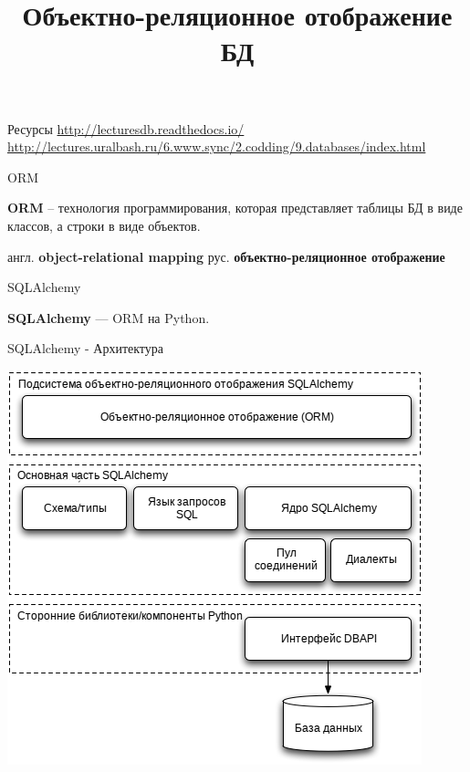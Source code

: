 

\title{Объектно-реляционное отображение БД}



\frame{\titlepage}

\begin{frame}{Ресурсы}
  \url{http://lecturesdb.readthedocs.io/}\newline
  \url{http://lectures.uralbash.ru/6.www.sync/2.codding/9.databases/index.html}
\end{frame}

\begin{frame}{ORM}

  \textbf{ORM} -- технология программирования, которая представляет таблицы БД
  в виде классов, а строки в виде объектов.

  англ. \textbf{object-relational mapping} \newline
  рус. \textbf{объектно-реляционное отображение}

\end{frame}

\begin{frame}{SQLAlchemy}

  \textbf{SQLAlchemy} — ORM на Python.

\end{frame}

\begin{frame}{SQLAlchemy - Архитектура}

  \begin{center}
    \includegraphics[height=\textheight]{media/sqlalchemy_layers_ru.png}
  \end{center}

\end{frame}

